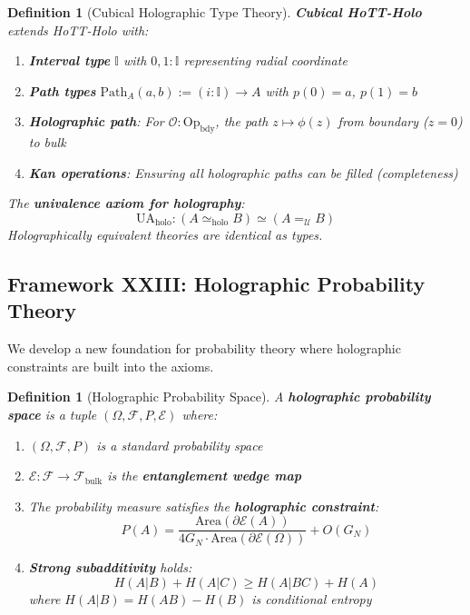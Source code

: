 \documentclass[12pt,a4paper]{article}
\newtheorem{definition}[theorem]{Definition}
\begin{document}
\begin{definition}[Cubical Holographic Type Theory]\label{def:cubical-holo}
\textbf{Cubical HoTT-Holo} extends HoTT-Holo with:
\begin{enumerate}
    \item \textbf{Interval type} $\mathbb{I}$ with $0, 1 : \mathbb{I}$ representing radial coordinate
    \item \textbf{Path types} $\text{Path}_A(a, b) := (i : \mathbb{I}) \to A$ with $p(0) = a$, $p(1) = b$
    \item \textbf{Holographic path}: For $\mathcal{O} : \text{Op}_{\text{bdy}}$, the path $z \mapsto \phi(z)$ from boundary ($z=0$) to bulk
    \item \textbf{Kan operations}: Ensuring all holographic paths can be filled (completeness)
\end{enumerate}

The \textbf{univalence axiom for holography}:
\begin{equation}
\text{UA}_{\text{holo}} : (A \simeq_{\text{holo}} B) \simeq (A =_{\mathcal{U}} B)
\end{equation}
Holographically equivalent theories are \emph{identical} as types.
\end{definition}

\subsection{Framework XXIII: Holographic Probability Theory}

We develop a new foundation for probability theory where holographic constraints are built into the axioms.

\begin{definition}[Holographic Probability Space]\label{def:holo-prob}
A \textbf{holographic probability space} is a tuple $(\Omega, \mathcal{F}, P, \mathcal{E})$ where:
\begin{enumerate}
    \item $(\Omega, \mathcal{F}, P)$ is a standard probability space
    \item $\mathcal{E}: \mathcal{F} \to \mathcal{F}_{\text{bulk}}$ is the \textbf{entanglement wedge map}
    \item The probability measure satisfies the \textbf{holographic constraint}:
    \begin{equation}
    P(A) = \frac{\text{Area}(\partial\mathcal{E}(A))}{4G_N \cdot \text{Area}(\partial\mathcal{E}(\Omega))} + O(G_N)
    \end{equation}
    \item \textbf{Strong subadditivity} holds:
    \begin{equation}
    H(A|B) + H(A|C) \geq H(A|BC) + H(A)
    \end{equation}
    where $H(A|B) = H(AB) - H(B)$ is conditional entropy
\end{enumerate}
\end{definition}
\end{document}
